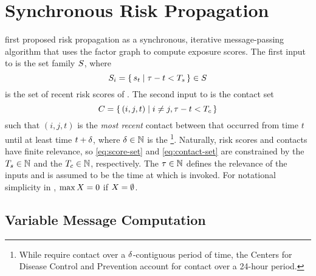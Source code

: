 \section{Synchronous Risk Propagation}\label{sec:synchronous}

\newcommand{\pDiff}{\epsilon}
\newcommand{\topK}[1]{\text{top } K \text{ of } #1}
\newcommand{\vMaxExpScore}{r}
\newcommand{\vIndexedExpScores}[2]{\vExpScores[#1]^{(#2)}}
\NewDocumentCommand{\vIndexedMaxExpScores}{om}{
  \IfValueTF{#1}
    {\vMaxExpScore_{#1}^{(#2)}}
    {\mathbf{\vMaxExpScore}^{(#2)}}
}
\newcommand{\dist}{d}

\citet{Ayday2021} first proposed risk propagation as a synchronous, iterative message-passing algorithm that uses the factor graph to compute exposure scores. The first input to \cRiskPropagation{} is the set family $S$, where
%
\begin{equation} \label{eq:score-set}
  S_i =\set{ s_t | \tau- t < T_s} \in S
\end{equation}
%
is the set of recent risk scores of . The second input to \cRiskPropagation{} is the contact set
%
\begin{equation} \label{eq:contact-set}
  C = \set{ (i, j, t) | i \neq j, \tau- t < T_c}
\end{equation}
%
such that $(i, j, t)$ is the \emph{most recent} contact between  that occurred from time $t$ until at least time $t + \delta$, where $\delta \in \mathbb{N}$ is the \footnote{While \citet{Ayday2021} require contact over a $\delta$-contiguous period of time, the Centers for Disease Control and Prevention \citeyearpar{CDC2021} account for contact over a 24-hour period.}. Naturally, risk scores and contacts have finite relevance, so \eqref{eq:score-set} and \eqref{eq:contact-set} are constrained by the  $T_s \in \mathbb{N}$ and the  $T_c \in \mathbb{N}$, respectively. The  $\tau \in \mathbb{N}$ defines the relevance of the inputs and is assumed to be the time at which \cRiskPropagation{} is invoked. For notational simplicity in \cRiskPropagation{}, $\max X = 0$ if $X = \emptyset$.

\subsection{Variable Message Computation}

